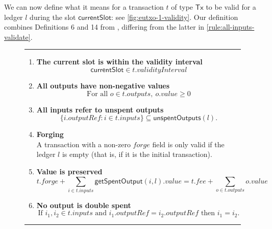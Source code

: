 \documentclass[a4paper]{article}
\renewcommand{\i}{\textit}  %
\newcommand{\msf}[1]{\ensuremath{\mathsf{#1}}}
\newcommand{\mi}[1]{\ensuremath{\mathit{#1}}}
\newcommand\rfskip{7pt}
\newenvironment{ruledfigure}[1]{\begin{figure}[#1]\hrule\vspace{\rfskip}}{\vspace{\rfskip}\hrule\end{figure}}
\newcommand{\inputs}{\mi{inputs}}
\newcommand{\outputs}{\mi{outputs}}
\newcommand{\forge}{\mi{forge}}
\newcommand{\fee}{\mi{fee}}
\newcommand{\val}{\mi{value}}  %
\newcommand{\outputref}{\mi{outputRef}}
\newcommand{\getSpent}{\msf{getSpentOutput}}
\newcommand{\unspent}{\msf{unspentOutputs}}
\newcommand{\eutxotx}{\msf{Tx}}
\begin{document}
\medskip

We can now define what it means for a transaction $t$ of type
$\eutxotx$ to be valid for a ledger $l$ during the slot
$\msf{currentSlot}$: see \cref{fig:eutxo-1-validity}.  Our definition
combines Definitions 6 and 14 from \citep{Zahnentferner18-UTxO},
differing from the latter in \cref{rule:all-inputs-validate}.

\begin{ruledfigure}{H}
\begin{enumerate}

\item
  \label{rule:slot-in-range}
  \textbf{The current slot is within the validity interval}
  \begin{displaymath}
    \msf{currentSlot} \in t.\i{validityInterval}
  \end{displaymath}

\item
  \label{rule:all-outputs-are-non-negative}
  \textbf{All outputs have non-negative values}
  \begin{displaymath}
    \textrm{For all } o \in t.\outputs,\ o.\val \geq 0
  \end{displaymath}

\item
  \label{rule:all-inputs-refer-to-unspent-outputs}
  \textbf{All inputs refer to unspent outputs}
  \begin{displaymath}
    \{i.\outputref: i \in t.\inputs \} \subseteq \unspent(l).
  \end{displaymath}

\item
  \label{rule:forging}
  \textbf{Forging} \\
    A transaction with a non-zero \forge{}
    field is only valid if the ledger $l$ is empty (that
    is, if it is the initial transaction).

\item
  \label{rule:value-is-preserved}
  \textbf{Value is preserved}
  \begin{displaymath}
    t.\forge + \sum_{i \in t.\inputs} \getSpent(i, l).\val = t.\fee + \sum_{o \in t.\outputs} o.\val
  \end{displaymath}

\item
  \label{rule:no-double-spending}
  \textbf{No output is double spent}
  \begin{displaymath}
    \textrm{If } i_1, i_2 \in t.\inputs \textrm{ and }  i_1.\outputref = i_2.\outputref
    \textrm{ then } i_1 = i_2.
  \end{displaymath}


\end{enumerate}
\end{ruledfigure}
\end{document}

